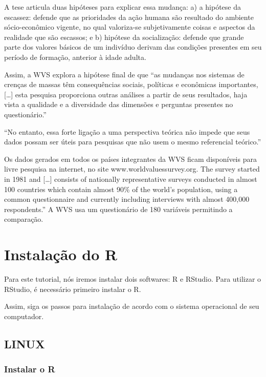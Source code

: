 \documentclass[
  brazil,
]{book}
\begin{document}
A tese articula duas hipóteses para explicar essa mudança: a) a hipótese da escassez: defende que as prioridades da ação humana são resultado do ambiente sócio-econômico vigente, no qual valoriza-se subjetivamente coisas e aspectos da realidade que são escassos; e b) hipótese da socialização: defende que grande parte dos valores básicos de um indivíduo derivam das condições presentes em seu período de formação, anterior à idade adulta.

Assim, a WVS explora a hipótese final de que ``as mudanças nos sistemas de crenças de massas têm consequências sociais, políticas e econômicas importantes, {[}\ldots{]} esta pesquisa proporciona outras análises a partir de seus resultados, haja vista a qualidade e a diversidade das dimensões e perguntas presentes no questionário.'' \citep{castro_conteudo_2015}

``No entanto, essa forte ligação a uma perspectiva teórica não impede que seus dados possam ser úteis para pesquisas que não usem o mesmo referencial teórico.'' \citep{castro_conteudo_2015}

Os dados gerados em todos os países integrantes da WVS ficam disponíveis para livre pesquisa na internet, no site www.worldvaluessurvey.org. The survey started in 1981 and {[}\ldots{]} consists of nationally representative surveys conducted in almost 100 countries which contain almost 90\% of the world's population, using a common questionnaire and currently including interviews with almost 400,000 respondents.'' A WVS usa um questionário de 180 variáveis permitindo a comparação.

\hypertarget{instalauxe7uxe3o-do-r}{%
\chapter{Instalação do R}\label{instalauxe7uxe3o-do-r}}

Para este tutorial, nós iremos instalar dois softwares: R e RStudio. Para utilizar o RStudio, é necessário primeiro instalar o R.

Assim, siga os passos para instalação de acordo com o sistema operacional de seu computador.

\hypertarget{linux}{%
\section{LINUX}\label{linux}}

\hypertarget{instalar-o-r}{%
\subsection{Instalar o R}\label{instalar-o-r}}
\end{document}
